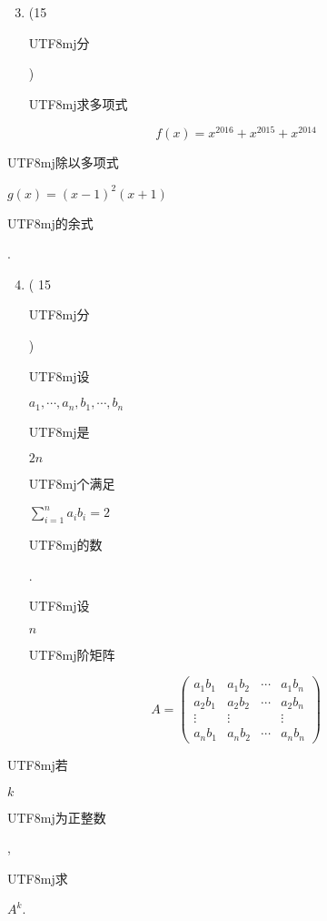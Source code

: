 \documentclass[10pt]{article}
\begin{document}
\begin{enumerate}
  \setcounter{enumi}{2}
  \item (15 \begin{CJK}{UTF8}{mj}分\end{CJK}) \begin{CJK}{UTF8}{mj}求多项式\end{CJK}
\end{enumerate}
$$
f(x)=x^{2016}+x^{2015}+x^{2014}
$$
\begin{CJK}{UTF8}{mj}除以多项式\end{CJK} $g(x)=(x-1)^{2}(x+1)$ \begin{CJK}{UTF8}{mj}的余式\end{CJK}.

\begin{enumerate}
  \setcounter{enumi}{3}
  \item ( 15 \begin{CJK}{UTF8}{mj}分\end{CJK}) \begin{CJK}{UTF8}{mj}设\end{CJK} $a_{1}, \cdots, a_{n}, b_{1}, \cdots, b_{n}$ \begin{CJK}{UTF8}{mj}是\end{CJK} $2 n$ \begin{CJK}{UTF8}{mj}个满足\end{CJK} $\sum_{i=1}^{n} a_{i} b_{i}=2$ \begin{CJK}{UTF8}{mj}的数\end{CJK}. \begin{CJK}{UTF8}{mj}设\end{CJK} $n$ \begin{CJK}{UTF8}{mj}阶矩阵\end{CJK}
\end{enumerate}
$$
A=\left(\begin{array}{cccc}
a_{1} b_{1} & a_{1} b_{2} & \cdots & a_{1} b_{n} \\
a_{2} b_{1} & a_{2} b_{2} & \cdots & a_{2} b_{n} \\
\vdots & \vdots & & \vdots \\
a_{n} b_{1} & a_{n} b_{2} & \cdots & a_{n} b_{n}
\end{array}\right)
$$
\begin{CJK}{UTF8}{mj}若\end{CJK} $k$ \begin{CJK}{UTF8}{mj}为正整数\end{CJK}, \begin{CJK}{UTF8}{mj}求\end{CJK} $A^{k}$.
\end{document}
